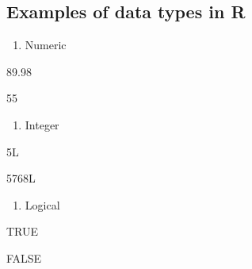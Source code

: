 \documentclass[
  letterpaper,
  DIV=11,
  numbers=noendperiod]{scrreprt}
\newenvironment{Shaded}{}{}
\newcommand{\ConstantTok}[1]{\textcolor[rgb]{0.00,0.36,0.77}{#1}}
\newcommand{\DecValTok}[1]{\textcolor[rgb]{0.00,0.36,0.77}{#1}}
\newcommand{\FloatTok}[1]{\textcolor[rgb]{0.00,0.36,0.77}{#1}}
\newcommand{\NormalTok}[1]{\textcolor[rgb]{0.14,0.16,0.18}{#1}}
\providecommand{\tightlist}{%
  \setlength{\itemsep}{0pt}\setlength{\parskip}{0pt}}\usepackage{longtable,booktabs,array}
\begin{document}
\subsection{Examples of data types in
R}\label{examples-of-data-types-in-r}

\begin{enumerate}
\def\labelenumi{\arabic{enumi}.}
\tightlist
\item
  Numeric
\end{enumerate}

\begin{Shaded}
\begin{Highlighting}[]
\FloatTok{89.98}
\end{Highlighting}
\end{Shaded}

\begin{Shaded}
\begin{Highlighting}[]
\DecValTok{55}
\end{Highlighting}
\end{Shaded}

\begin{enumerate}
\def\labelenumi{\arabic{enumi}.}
\setcounter{enumi}{1}
\tightlist
\item
  Integer
\end{enumerate}

\begin{Shaded}
\begin{Highlighting}[]
\DecValTok{5}\NormalTok{L}
\end{Highlighting}
\end{Shaded}

\begin{Shaded}
\begin{Highlighting}[]
\DecValTok{5768}\NormalTok{L}
\end{Highlighting}
\end{Shaded}

\begin{enumerate}
\def\labelenumi{\arabic{enumi}.}
\setcounter{enumi}{2}
\tightlist
\item
  Logical
\end{enumerate}

\begin{Shaded}
\begin{Highlighting}[]
\ConstantTok{TRUE}
\end{Highlighting}
\end{Shaded}

\begin{Shaded}
\begin{Highlighting}[]
\ConstantTok{FALSE}
\end{Highlighting}
\end{Shaded}
\end{document}
